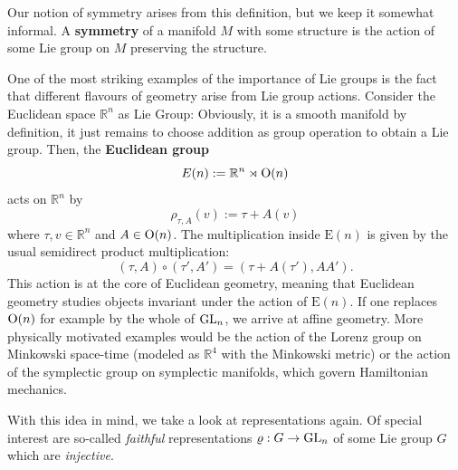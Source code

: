 Our notion of symmetry arises from this definition, but we keep it somewhat informal. A \textbf{symmetry} of a manifold $M$ with some structure is the action of some Lie group on $M$ preserving the structure. 
\begin{eg}
    One of the most striking examples of the importance of Lie groups is the fact that different flavours of geometry arise from Lie group actions. Consider the Euclidean space $\mathbb{R}^n$ as Lie Group: Obviously, it is a smooth manifold by definition, it just remains to choose addition as group operation to obtain a Lie group. 
    Then, the \textbf{Euclidean group} \[
        E(n) := \mathbb{R}^{n} \rtimes \operatorname{O}(n)
    \] acts on $\mathbb{R}^n$ by \[
    \rho_{\tau, A}(v):=\tau+A(v) 
\]  where $\tau,v \in \mathbb{R}^n$ and $A \in \operatorname{O}(n)$. The multiplication inside $\text{E}(n)$ is given by the usual semidirect product multiplication: \[
(\tau, A) \circ (\tau', A') = (\tau + A(\tau'), AA')
.\] This action is at the core of Euclidean geometry, meaning that Euclidean geometry studies objects invariant under the action of $\text{E}(n)$. If one replaces $\operatorname{O}(n)$ for example by the whole of $\operatorname{GL}_n$, we arrive at affine geometry. More physically motivated examples would be the action of the Lorenz group on Minkowski space-time (modeled as $\mathbb{R}^4$ with the Minkowski metric) or the action of the symplectic group on symplectic manifolds, which govern Hamiltonian mechanics.
\end{eg}
With this idea in mind, we take a look at representations again. Of special interest are so-called \emph{faithful} representations $\varrho: G \to \operatorname{GL}_n$ of some Lie group $G$ which are \emph{injective}.
